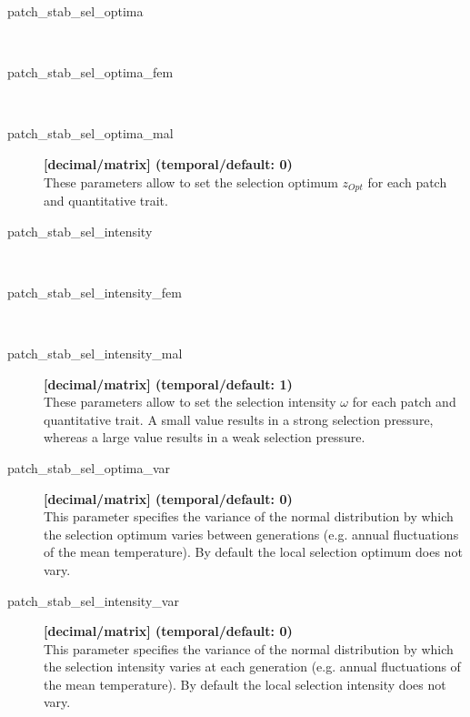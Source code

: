 \documentclass[letterpaper,12pt,oneside]{book}
\begin{document}
\begin{description}

\item[patch\_stab\_sel\_optima]\hspace*{\fill}\\
\vspace{-9mm}
\item[patch\_stab\_sel\_optima\_fem]\hspace*{\fill}\\
\vspace{-9mm}
\item[patch\_stab\_sel\_optima\_mal]\textbf{[decimal/matrix] (temporal/default: 0)}\\
These parameters allow to set the selection optimum $z_{Opt}$ for each patch and quantitative trait.

\item[patch\_stab\_sel\_intensity]\hspace*{\fill}\\
\vspace{-9mm}
\item[patch\_stab\_sel\_intensity\_fem]\hspace*{\fill}\\
\vspace{-9mm}
\item[patch\_stab\_sel\_intensity\_mal]\textbf{[decimal/matrix] (temporal/default: 1)}\\
These parameters allow to set the selection intensity $\omega$ for each patch and quantitative trait. A small value results in a strong selection pressure, whereas a large value results in a weak selection pressure.

\item[patch\_stab\_sel\_optima\_var]\textbf{[decimal/matrix] (temporal/default: 0)}\\
This parameter specifies the variance of the normal distribution by which the selection optimum varies between generations (e.g. annual fluctuations of the mean temperature). By default the local selection optimum does not vary.

\item[patch\_stab\_sel\_intensity\_var]\textbf{[decimal/matrix] (temporal/default: 0)}\\
This parameter specifies the variance of the normal distribution by which the selection intensity varies at each generation (e.g. annual fluctuations of the mean temperature). By default the local selection intensity does not vary.
\end{description}
\end{document}
